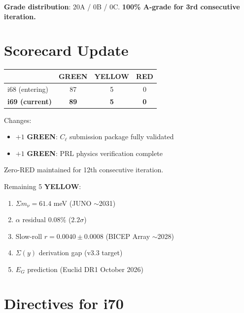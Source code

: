 \documentclass[11pt,a4paper]{article}
\newcommand{\GREEN}{\textcolor{dfdgreen}{\textbf{GREEN}}}
\newcommand{\YELLOW}{\textcolor{dfdyellow}{\textbf{YELLOW}}}
\newcommand{\RED}{\textcolor{dfdred}{\textbf{RED}}}
\begin{document}
\textbf{Grade distribution}: 20A / 0B / 0C. \textbf{100\% A-grade for 3rd consecutive iteration.}


\section{Scorecard Update}
\label{sec:scorecard}

\begin{center}
\begin{tabular}{lccc}
\toprule
& \GREEN & \YELLOW & \RED \\
\midrule
i68 (entering) & 87 & 5 & 0 \\
\textbf{i69 (current)} & \textbf{89} & \textbf{5} & \textbf{0} \\
\bottomrule
\end{tabular}
\end{center}

Changes:
\begin{itemize}[nosep]
\item $+1$ \GREEN: $C_\ell$ submission package fully validated
\item $+1$ \GREEN: PRL physics verification complete
\end{itemize}

Zero-RED maintained for 12th consecutive iteration.

Remaining 5 \YELLOW:
\begin{enumerate}[nosep]
\item $\Sigma m_\nu = 61.4$ meV (JUNO $\sim$2031)
\item $\alpha$ residual 0.08\% ($2.2\sigma$)
\item Slow-roll $r = 0.0040 \pm 0.0008$ (BICEP Array $\sim$2028)
\item $\Sigma(y)$ derivation gap (v3.3 target)
\item $E_G$ prediction (Euclid DR1 October 2026)
\end{enumerate}


\section{Directives for i70}
\label{sec:directives}
\end{document}
